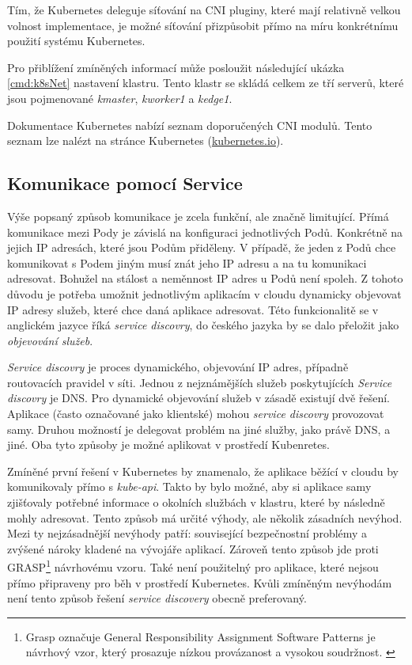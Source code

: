 \bigskip

Tím, že Kubernetes deleguje síťování na CNI pluginy, které mají relativně velkou volnost implementace, je možné síťování přizpůsobit přímo na míru konkrétnímu použití systému Kubernetes.

Pro přiblížení zmíněných informací může posloužit následující ukázka \ref{cmd:k8sNet} nastavení klastru. Tento klastr se skládá celkem ze tří serverů, které jsou pojmenované \textit{kmaster}, \textit{kworker1} a \textit{kedge1}. \cite{thekubernetesauthors_2023_kubectl}




Dokumentace Kubernetes nabízí seznam doporučených CNI modulů. Tento seznam lze nalézt na stránce Kubernetes (\href{https://kubernetes.io/docs/concepts/cluster-administration/addons/#networking-and-network-policy}{kubernetes.io}).

\subsection{Komunikace pomocí Service}
Výše popsaný způsob komunikace je zcela funkční, ale značně limitující. Přímá komunikace mezi Pody je závislá na konfiguraci jednotlivých Podů. Konkrétně na jejich IP adresách, které jsou Podům přiděleny. V případě, že jeden z Podů chce komunikovat s Podem jiným musí znát jeho IP adresu a na tu komunikaci adresovat. Bohužel na stálost a neměnnost IP adres u Podů není spoleh. Z tohoto důvodu je potřeba umožnit jednotlivým aplikacím v cloudu dynamicky objevovat IP adresy služeb, které chce daná aplikace adresovat. Této funkcionalitě se v anglickém jazyce říká \textit{service discovry}, do českého jazyka by se dalo přeložit jako \textit{objevování služeb}. 

\textit{Service discovry} je proces dynamického, objevování IP adres, případně routovacích pravidel v síti. Jednou z nejznámějších služeb poskytujících \textit{Service discovry} je DNS. Pro dynamické objevování služeb v zásadě existují dvě řešení. Aplikace (často označované jako klientské) mohou \textit{service discovry} provozovat samy. Druhou možností je delegovat problém na jiné služby, jako právě DNS, a jiné. Oba tyto způsoby je možné aplikovat v prostředí Kubenretes. 

Zmíněné první řešení v Kubernetes by znamenalo, že aplikace běžící v cloudu by komunikovaly přímo s \textit{kube-api}. Takto by bylo možné, aby si aplikace samy zjišťovaly potřebné informace o okolních službách v klastru, které by následně mohly adresovat. Tento způsob má určité výhody, ale několik zásadních nevýhod. Mezi ty nejzásadnější nevýhody patří: související bezpečnostní problémy a zvýšené nároky kladené na vývojáře aplikací. Zároveň tento způsob jde proti GRASP\footnote{Grasp označuje General Responsibility Assignment Software Patterns je návrhový vzor, který prosazuje nízkou provázanost a vysokou soudržnost. \cite{mlejnek_2018_architektonick}} návrhovému vzoru. Také není použitelný pro aplikace, které nejsou přímo připraveny pro běh v prostředí Kubernetes. Kvůli zmíněným nevýhodám není tento způsob řešení \textit{service discovery} obecně preferovaný.

